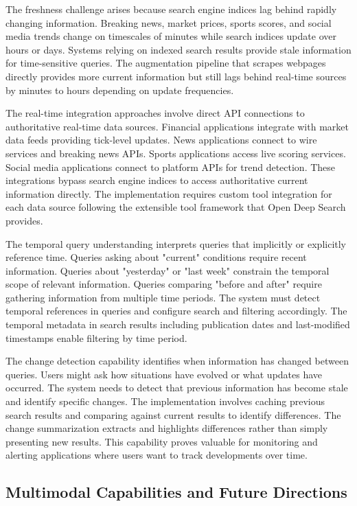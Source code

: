 The freshness challenge arises because search engine indices lag behind rapidly changing information. Breaking news, market prices, sports scores, and social media trends change on timescales of minutes while search indices update over hours or days. Systems relying on indexed search results provide stale information for time-sensitive queries. The augmentation pipeline that scrapes webpages directly provides more current information but still lags behind real-time sources by minutes to hours depending on update frequencies.

The real-time integration approaches involve direct API connections to authoritative real-time data sources. Financial applications integrate with market data feeds providing tick-level updates. News applications connect to wire services and breaking news APIs. Sports applications access live scoring services. Social media applications connect to platform APIs for trend detection. These integrations bypass search engine indices to access authoritative current information directly. The implementation requires custom tool integration for each data source following the extensible tool framework that Open Deep Search provides.

The temporal query understanding interprets queries that implicitly or explicitly reference time. Queries asking about "current" conditions require recent information. Queries about "yesterday" or "last week" constrain the temporal scope of relevant information. Queries comparing "before and after" require gathering information from multiple time periods. The system must detect temporal references in queries and configure search and filtering accordingly. The temporal metadata in search results including publication dates and last-modified timestamps enable filtering by time period.

The change detection capability identifies when information has changed between queries. Users might ask how situations have evolved or what updates have occurred. The system needs to detect that previous information has become stale and identify specific changes. The implementation involves caching previous search results and comparing against current results to identify differences. The change summarization extracts and highlights differences rather than simply presenting new results. This capability proves valuable for monitoring and alerting applications where users want to track developments over time.

\subsection{Multimodal Capabilities and Future Directions}

